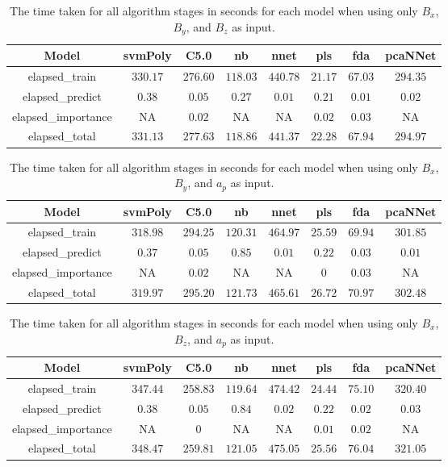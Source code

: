 \begin{table}[!ht]
	\centering
	\begin{tabular}{|c|c|c|c|c|c|c|c|}
		\hline
		Model & svmPoly & C5.0 & nb & nnet & pls & fda & pcaNNet \\ \hline
		elapsed_train & $330.17$ & $276.60$ & $118.03$ & $440.78$ & $21.17$ & $67.03$ & $294.35$ \\ \hline
		elapsed_predict & $0.38$ & $0.05$ & $0.27$ & $0.01$ & $0.21$ & $0.01$ & $0.02$ \\ \hline
		elapsed_importance & NA & $0.02$ & NA & NA & $0.02$ & $0.03$ & NA \\ \hline
		elapsed_total & $331.13$ & $277.63$ & $118.86$ & $441.37$ & $22.28$ & $67.94$ & $294.97$ \\ \hline
	\end{tabular}
	\caption{The time taken for all algorithm stages in seconds for each model when using only $B_{x}$, $B_{y}$, and $B_{z}$ as input.}
	\label{tab:time:reverse:coord}
\end{table}

\begin{table}[!ht]
	\centering
	\begin{tabular}{|c|c|c|c|c|c|c|c|}
		\hline
		Model & svmPoly & C5.0 & nb & nnet & pls & fda & pcaNNet \\ \hline
		elapsed_train & $318.98$ & $294.25$ & $120.31$ & $464.97$ & $25.59$ & $69.94$ & $301.85$ \\ \hline
		elapsed_predict & $0.37$ & $0.05$ & $0.85$ & $0.01$ & $0.22$ & $0.03$ & $0.01$ \\ \hline
		elapsed_importance & NA & $0.02$ & NA & NA & $0$ & $0.03$ & NA \\ \hline
		elapsed_total & $319.97$ & $295.20$ & $121.73$ & $465.61$ & $26.72$ & $70.97$ & $302.48$ \\ \hline
	\end{tabular}
	\caption{The time taken for all algorithm stages in seconds for each model when using only $B_{x}$, $B_{y}$, and $a_{p}$ as input.}
	\label{tab:time:reverse:xyap}
\end{table}

\begin{table}[!ht]
	\centering
	\begin{tabular}{|c|c|c|c|c|c|c|c|}
		\hline
		Model & svmPoly & C5.0 & nb & nnet & pls & fda & pcaNNet \\ \hline
		elapsed_train & $347.44$ & $258.83$ & $119.64$ & $474.42$ & $24.44$ & $75.10$ & $320.40$ \\ \hline
		elapsed_predict & $0.38$ & $0.05$ & $0.84$ & $0.02$ & $0.22$ & $0.02$ & $0.03$ \\ \hline
		elapsed_importance & NA & $0$ & NA & NA & $0.01$ & $0.02$ & NA \\ \hline
		elapsed_total & $348.47$ & $259.81$ & $121.05$ & $475.05$ & $25.56$ & $76.04$ & $321.05$ \\ \hline
	\end{tabular}
	\caption{The time taken for all algorithm stages in seconds for each model when using only $B_{x}$, $B_{z}$, and $a_{p}$ as input.}
	\label{tab:time:reverse:xzap}
\end{table}

